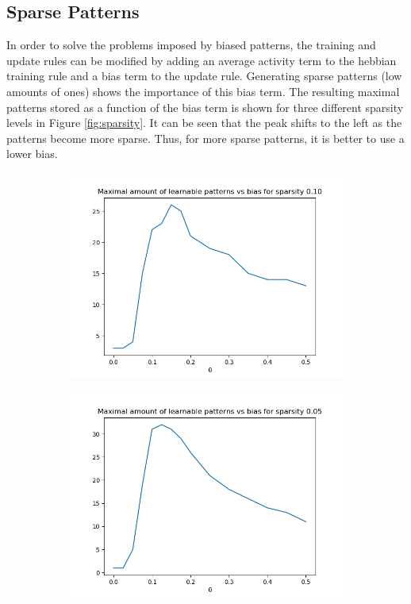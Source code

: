 \documentclass[a4paper]{article}
\begin{document}
\subsection{Sparse Patterns}
In order to solve the problems imposed by biased patterns, the training and update rules can be modified by adding an average activity term to the hebbian training rule and a bias term to the update rule. Generating sparse patterns (low amounts of ones) shows the importance of this bias term. The resulting maximal patterns stored as a function of the bias term is shown for three different sparsity levels in Figure \ref{fig:sparsity}. It can be seen that the peak shifts to the left as the patterns become more sparse. Thus, for more sparse patterns, it is better to use a lower bias.
\begin{figure}[ht]
  \begin{subfigure}[b]{0.3\textwidth}
   \centering
   \includegraphics[width=\linewidth]{figures/c150s010.png}
  \end{subfigure}
  \begin{subfigure}[b]{0.3\textwidth}
   \centering
   \includegraphics[width=\linewidth]{figures/c150s005.png}

\end{subfigure}
\end{figure}
\end{document}
